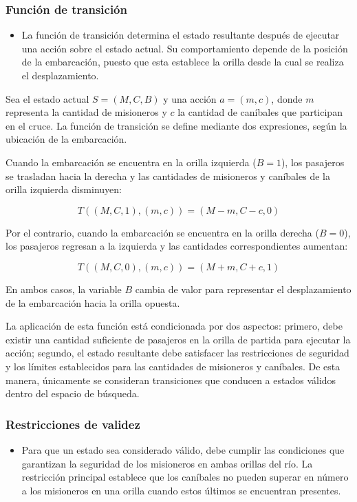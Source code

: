 \documentclass[
  spanish,
]{llncs}
\providecommand{\tightlist}{%
  \setlength{\itemsep}{0pt}\setlength{\parskip}{0pt}}
\begin{document}
\subsubsection{Función de transición}\label{funciuxf3n-de-transiciuxf3n}

\begin{itemize}
\tightlist
\item
  La función de transición determina el estado resultante después de
  ejecutar una acción sobre el estado actual. Su comportamiento depende
  de la posición de la embarcación, puesto que esta establece la orilla
  desde la cual se realiza el desplazamiento.
\end{itemize}

Sea el estado actual \(S=(M,C,B)\) y una acción \(a=(m,c)\), donde \(m\)
representa la cantidad de misioneros y \(c\) la cantidad de caníbales
que participan en el cruce. La función de transición se define mediante
dos expresiones, según la ubicación de la embarcación.

Cuando la embarcación se encuentra en la orilla izquierda (\(B=1\)), los
pasajeros se trasladan hacia la derecha y las cantidades de misioneros y
caníbales de la orilla izquierda disminuyen:

\[
T((M,C,1),(m,c))=(M-m,C-c,0)
\]

Por el contrario, cuando la embarcación se encuentra en la orilla
derecha (\(B=0\)), los pasajeros regresan a la izquierda y las
cantidades correspondientes aumentan:

\[
T((M,C,0),(m,c))=(M+m,C+c,1)
\]

En ambos casos, la variable \(B\) cambia de valor para representar el
desplazamiento de la embarcación hacia la orilla opuesta.

La aplicación de esta función está condicionada por dos aspectos:
primero, debe existir una cantidad suficiente de pasajeros en la orilla
de partida para ejecutar la acción; segundo, el estado resultante debe
satisfacer las restricciones de seguridad y los límites establecidos
para las cantidades de misioneros y caníbales. De esta manera,
únicamente se consideran transiciones que conducen a estados válidos
dentro del espacio de búsqueda.

\subsubsection{Restricciones de validez}\label{restricciones-de-validez}

\begin{itemize}
\tightlist
\item
  Para que un estado sea considerado válido, debe cumplir las
  condiciones que garantizan la seguridad de los misioneros en ambas
  orillas del río. La restricción principal establece que los caníbales
  no pueden superar en número a los misioneros en una orilla cuando
  estos últimos se encuentran presentes.
\end{itemize}
\end{document}
